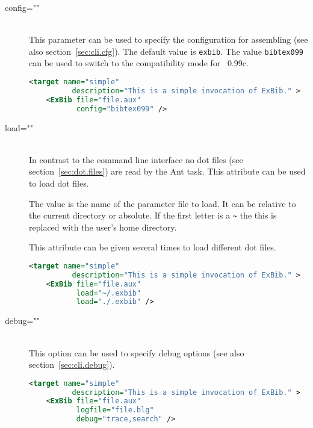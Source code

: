 \begin{description}
\item[config=""] \ \\
  This parameter can be used to specify the configuration for
  assembling \ExBib{} (see also section~\ref{sec:cli.cfg}). The
  default value is \texttt{exbib}. The value \texttt{bibtex099} can be
  used to switch to the compatibility mode for
  \BibTeX~0.99c.

\begin{lstlisting}[language=XML,morekeywords={target}]
  <target name="simple"
          description="This is a simple invocation of ExBib." >
    <ExBib file="file.aux"
           config="bibtex099" />
\end{lstlisting}
  
\item[load=""] \ \\
  In contrast to the command line interface no dot files (see
  section~\ref{sec:dot.files}) are read by the Ant task. This
  attribute can be used to load dot files.
  
  The value is the name of the parameter file to load. It can be
  relative to the current directory or absolute.  If the first letter
  is a \verb|~| the this is replaced with the user's home directory.

  This attribute can be given several times to load different dot
  files.

\begin{lstlisting}[language=XML,morekeywords={target}]
  <target name="simple"
          description="This is a simple invocation of ExBib." >
    <ExBib file="file.aux"
           load="~/.exbib"
           load="./.exbib" />
\end{lstlisting}

\item[debug=""] \ \\
  This option can be used to specify debug options (see also
  section~\ref{sec:cli.debug}).

\begin{lstlisting}[language=XML,morekeywords={target}]
  <target name="simple"
          description="This is a simple invocation of ExBib." >
    <ExBib file="file.aux"
           logfile="file.blg"
           debug="trace,search" />
\end{lstlisting}

\end{description}


\endinput
%
